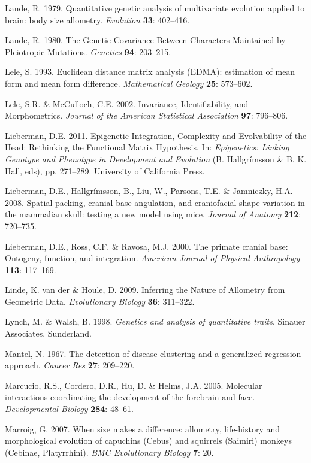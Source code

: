 \documentclass[12pt,twoside]{report}
\begin{document}
Lande, R. 1979. Quantitative genetic analysis of multivariate evolution
applied to brain: body size allometry. \emph{Evolution} \textbf{33}:
402--416.

Lande, R. 1980. The Genetic Covariance Between Characters Maintained by
Pleiotropic Mutations. \emph{Genetics} \textbf{94}: 203--215.

Lele, S. 1993. Euclidean distance matrix analysis (EDMA): estimation of
mean form and mean form difference. \emph{Mathematical Geology}
\textbf{25}: 573--602.

Lele, S.R. \& McCulloch, C.E. 2002. Invariance, Identifiability, and
Morphometrics. \emph{Journal of the American Statistical Association}
\textbf{97}: 796--806.

Lieberman, D.E. 2011. Epigenetic Integration, Complexity and
Evolvability of the Head: Rethinking the Functional Matrix Hypothesis.
In: \emph{Epigenetics: Linking Genotype and Phenotype in Development and
Evolution} (B. Hallgrímsson \& B. K. Hall, eds), pp. 271--289.
University of California Press.

Lieberman, D.E., Hallgrímsson, B., Liu, W., Parsons, T.E. \& Jamniczky,
H.A. 2008. Spatial packing, cranial base angulation, and craniofacial
shape variation in the mammalian skull: testing a new model using mice.
\emph{Journal of Anatomy} \textbf{212}: 720--735.

Lieberman, D.E., Ross, C.F. \& Ravosa, M.J. 2000. The primate cranial
base: Ontogeny, function, and integration. \emph{American Journal of
Physical Anthropology} \textbf{113}: 117--169.

Linde, K. van der \& Houle, D. 2009. Inferring the Nature of Allometry
from Geometric Data. \emph{Evolutionary Biology} \textbf{36}: 311--322.

Lynch, M. \& Walsh, B. 1998. \emph{Genetics and analysis of quantitative
traits}. Sinauer Associates, Sunderland.

Mantel, N. 1967. The detection of disease clustering and a generalized
regression approach. \emph{Cancer Res} \textbf{27}: 209--220.

Marcucio, R.S., Cordero, D.R., Hu, D. \& Helms, J.A. 2005. Molecular
interactions coordinating the development of the forebrain and face.
\emph{Developmental Biology} \textbf{284}: 48--61.

Marroig, G. 2007. When size makes a difference: allometry, life-history
and morphological evolution of capuchins (Cebus) and squirrels (Saimiri)
monkeys (Cebinae, Platyrrhini). \emph{BMC Evolutionary Biology}
\textbf{7}: 20.
\end{document}
